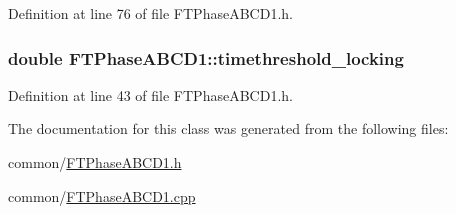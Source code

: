 Definition at line 76 of file FTPhaseABCD1.h.

\hypertarget{classFTPhaseABCD1_a5ad155e1d7ac3ad4c60f3c0768ae8e56}{
\subsubsection[{timethreshold\_\-locking}]{\setlength{\rightskip}{0pt plus 5cm}double {\bf FTPhaseABCD1::timethreshold\_\-locking}}}
\label{classFTPhaseABCD1_a5ad155e1d7ac3ad4c60f3c0768ae8e56}


Definition at line 43 of file FTPhaseABCD1.h.



The documentation for this class was generated from the following files:\begin{DoxyCompactItemize}
\item 
common/\hyperlink{FTPhaseABCD1_8h}{FTPhaseABCD1.h}\item 
common/\hyperlink{FTPhaseABCD1_8cpp}{FTPhaseABCD1.cpp}\end{DoxyCompactItemize}

